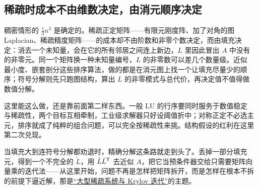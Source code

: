 \subsection{稀疏时成本不由维数决定，由消元顺序决定}

稠密情形的 \(\tfrac13n^3\) 是确定的。稀疏正定矩阵——有限元刚度阵、加了对角的图 Laplacian、稀疏精度矩阵——的成本却不由阶数和非零个数决定，而由填充决定：消去一个未知量，会在它的所有邻居之间连上新边，\(L\) 里因此冒出 \(A\) 中没有的非零元。同一个矩阵换一种未知量编号，\(L\) 的非零数可以差几个数量级。近似最小度、嵌套剖分这些排序算法，做的都是在消元图上找一个让填充尽量少的顺序；符号分解则先只跑图结构，算出 \(L\) 的非零模式与总代价，再决定值不值得做数值分解。

这里能这么做，还是靠前面第二样东西。一般 LU 的行序要同时服务于数值稳定与稀疏性，两个目标互相牵制，工业级求解器只好设阈值折中；对称正定不必选主元，排序就成了纯粹的组合问题，可以完全按稀疏性来挑。结构假设的红利在这里第二次兑现。

当填充大到连符号分解都劝退时，精确分解这条路就走到头了。丢掉一部分填充元，得到一个不完全的 \(\tilde L\)，用 \(\tilde L\tilde L^{\mathsf{T}}\) 去近似 \(A\)，把它当预条件器交给只需要矩阵向量乘的迭代法——从这里开始，问题不再是怎样把矩阵拆开，而是怎样在根本不拆的前提下逼近解，那是\hyperref[sec:08-Numerical-Analysis/05-Numerical-Linear-Algebra/04]{``大型稀疏系统与 Krylov 迭代''}的主题。
